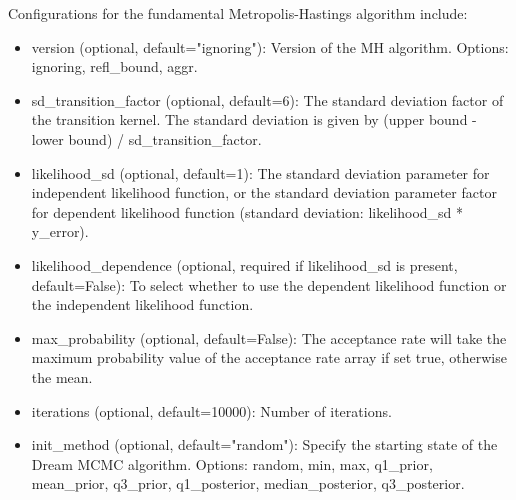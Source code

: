 Configurations for the fundamental Metropolis-Hastings algorithm include:
\begin{itemize}
    \item version (optional, default="ignoring"): Version of the MH algorithm. Options: ignoring, refl\_bound, aggr.
    \item sd\_transition\_factor (optional, default=6): The standard deviation factor of the transition kernel. The standard deviation is given by (upper bound - lower bound) / sd\_transition\_factor.
    \item likelihood\_sd (optional, default=1): The standard deviation parameter for independent likelihood function, or the standard deviation parameter factor for dependent likelihood function (standard deviation: likelihood\_sd * y\_error).
    \item likelihood\_dependence (optional, required if likelihood\_sd is present, default=False): To select whether to use the dependent likelihood function or the independent likelihood function.
    \item max\_probability (optional, default=False): The acceptance rate will take the maximum probability value of the acceptance rate array if set true, otherwise the mean.
    \item iterations (optional, default=10000): Number of iterations.
    \item init\_method (optional, default="random"): Specify the starting state of the Dream MCMC algorithm. Options: random, min, max, q1\_prior, mean\_prior, q3\_prior, q1\_posterior, median\_posterior, q3\_posterior.
\end{itemize}

